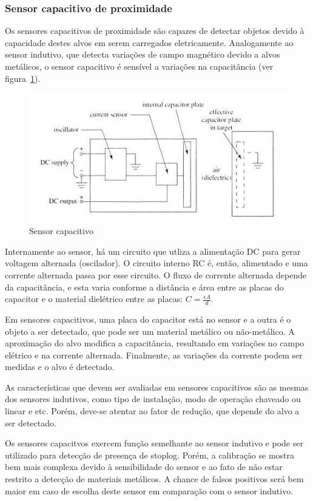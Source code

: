 
\subsubsection{Sensor capacitivo de proximidade}
Os sensores capacitivos de proximidade são capazes de detectar objetos devido à capacidade destes alvos em serem carregados eletricamente. Analogamente ao sensor indutivo, que detecta variações de campo magnético devido a alvos metálicos, o sensor capacitivo é sensível a variações na capacitância (ver figura~\ref{capacitivo_1}).

\begin{figure}[H]
    \centering
    \includegraphics[width=0.8\columnwidth]{figs/capacitivo/1.jpg}
    \caption{Sensor capacitivo}
    \label{capacitivo_1}
\end{figure}

Internamente ao sensor, há um circuito que utliza a alimentação DC para gerar voltagem alternada (oscilador). O circuito interno RC é, então, alimentado e uma corrente alternada passa por esse circuito. O fluxo de corrente alternada depende da capacitância, e esta varia  conforme a distância e área entre as placas do capacitor e o material dielétrico entre as placas: $C = \frac{\epsilon A}{d}$.

Em sensores capacitivos, uma placa do capacitor está no sensor e a outra é o objeto a ser detectado, que pode ser um material metálico ou não-metálico. A aproximação do alvo modifica a capacitância, resultando em variações no campo elétrico e na corrente alternada. Finalmente, as variações da corrente podem ser medidas e o alvo é detectado.

As características que devem ser avaliadas em sensores capacitivos são as mesmas dos sensores indutivos, como tipo de instalação, modo de operação chaveado ou linear e etc. Porém, deve-se atentar ao fator de redução, que depende do alvo a ser detectado.

 Os sensores capacitvos exercem função semelhante ao sensor indutivo e pode ser utilizado para detecção de presença de stoplog. Porém, a calibração se mostra bem mais complexa devido à sensibilidade do sensor e ao fato de não estar restrito a detecção de materiais metálicos. A chance de falsos positivos será bem maior em caso de escolha deste sensor em comparação com o sensor indutivo.


